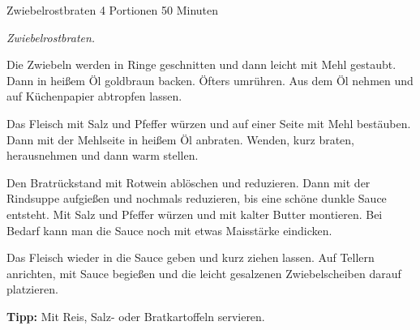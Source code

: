 \begin{recipe}{Zwiebelrostbraten} {4 Portionen} {50 Minuten}

  \freeform
  \textit{Zwiebelrostbraten.}


  Die Zwiebeln werden in Ringe geschnitten und dann leicht mit Mehl gestaubt.
  Dann in heißem Öl goldbraun backen.
  Öfters umrühren.
  Aus dem Öl nehmen und auf Küchenpapier abtropfen lassen.

  \newstep
  Das Fleisch mit Salz und Pfeffer würzen und auf einer Seite mit Mehl bestäuben.
  Dann mit der Mehlseite in heißem Öl anbraten.
  Wenden, kurz braten, herausnehmen und dann warm stellen.

  \newstep
  Den Bratrückstand mit Rotwein ablöschen und reduzieren.
  Dann mit der Rindsuppe aufgießen und nochmals reduzieren, bis eine schöne dunkle Sauce entsteht.
  Mit Salz und Pfeffer würzen und mit kalter Butter montieren.
  Bei Bedarf kann man die Sauce noch mit etwas Maisstärke eindicken.

  \newstep
  Das Fleisch wieder in die Sauce geben und kurz ziehen lassen.
  Auf Tellern anrichten, mit Sauce begießen und die leicht gesalzenen Zwiebelscheiben darauf platzieren.

  \freeform
  \hrulefill

  \freeform
  \textbf{Tipp:}
  Mit Reis, Salz- oder Bratkartoffeln servieren.

\end{recipe}
